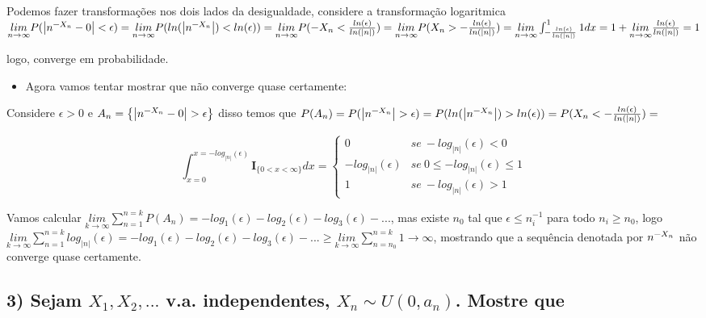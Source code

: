 \documentclass[english]{article}
\begin{document}
Podemos fazer transformações nos dois lados da desigualdade, considere
a transformação logaritmica $\underset{n\rightarrow\infty}{lim}P(\left|n^{\text{\textminus}X_{n}}-0\right|<\epsilon)=\underset{n\rightarrow\infty}{lim}P(ln(\left|n^{\text{\textminus}X_{n}}\right|)<ln(\epsilon))=\underset{n\rightarrow\infty}{lim}P(-X_{n}<\frac{ln(\epsilon)}{ln(\left|n\right|)})=\underset{n\rightarrow\infty}{lim}P(X_{n}>-\frac{ln(\epsilon)}{ln(\left|n\right|)})=\underset{n\rightarrow\infty}{lim}\int_{-\frac{ln(\epsilon)}{ln(\left|n\right|)}}^{1}1dx=1+\underset{n\rightarrow\infty}{lim}\frac{ln(\epsilon)}{ln(\left|n\right|)}=1$

logo, converge em probabilidade.
\begin{itemize}
\item Agora vamos tentar mostrar que não converge quase certamente:
\end{itemize}
Considere $\epsilon>0$ e $A_{n}=\left\{ \left|n^{\text{\textminus}X_{n}}-0\right|>\epsilon\right\} $
disso temos que $P(A_{n})=P(\left|n^{\text{\textminus}X_{n}}\right|>\epsilon)=P(ln(\left|n^{\text{\textminus}X_{n}}\right|)>ln(\epsilon))=P(X_{n}<-\frac{ln(\epsilon)}{ln(\left|n\right|)})=$

\[
\int_{x=0}^{x=-log_{\left|n\right|}(\epsilon)}\mathbf{I}_{\{0<x<\infty\}}dx=\begin{cases}
0 & se\ -log_{\left|n\right|}(\epsilon)<0\\
-log_{\left|n\right|}(\epsilon) & se\ 0\le-log_{\left|n\right|}(\epsilon)\le1\\
1 & se\ -log_{\left|n\right|}(\epsilon)>1
\end{cases}
\]


Vamos calcular $\underset{k\rightarrow\infty}{lim}\sum_{n=1}^{n=k}P(A_{n})=-log_{1}(\epsilon)-log_{2}(\epsilon)-log_{3}(\epsilon)-...$,
mas existe $n_{0}$ tal que $\epsilon\le n_{i}^{-1}$ para todo $n_{i}\ge n_{0}$,
logo $\underset{k\rightarrow\infty}{lim}\sum_{n=1}^{n=k}log_{\left|n\right|}(\epsilon)=-log_{1}(\epsilon)-log_{2}(\epsilon)-log_{3}(\epsilon)-...\ge\underset{k\rightarrow\infty}{lim}\sum_{n=n_{0}}^{n=k}1\to\infty$,
mostrando que a sequência denotada por $n^{\text{\textminus}X_{n}}$
não converge quase certamente.


\subsection*{\textcompwordmark{}}


\subsection*{\textmd{3) Sejam $X_{1},X_{2},...$ v.a. independentes, $X_{n}\sim U(0,a_{n})$.
Mostre que}}
\end{document}
